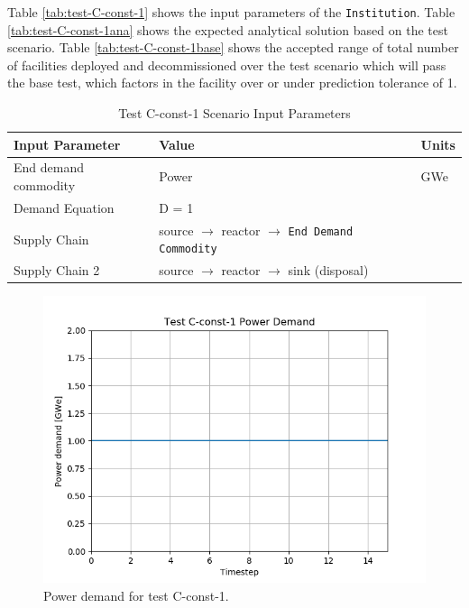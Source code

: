 \documentclass[11pt,letterpaper]{article}
\begin{document}
Table \ref{tab:test-C-const-1} shows the input parameters of the \texttt{Institution}. Table \ref{tab:test-C-const-1ana} shows the expected analytical solution based on the test scenario. Table \ref{tab:test-C-const-1base} shows the accepted range of total number of facilities deployed and decommissioned over the test scenario which will pass the base test, which factors in the facility over or under prediction tolerance of 1.

\begin{table}[H]
	\centering
	\caption{Test C-const-1 Scenario Input Parameters }
	\label{tab:test_C-const-1}
	\begin{tabular}{|l|l|l|}
		\hline
		\textbf{Input Parameter} & \textbf{Value} & \textbf{Units} \\
		\hline
		End demand commodity & Power & GWe \\
		Demand Equation & D = 1 & \\
		Supply Chain & source $\rightarrow$ reactor $\rightarrow$ \texttt{End Demand Commodity} &  \\
		Supply Chain 2 & source $\rightarrow$ reactor $\rightarrow$ sink (disposal) & \\
		\hline
	\end{tabular}
\end{table}

\begin{figure}[H]
	\begin{center}
		\includegraphics[scale=0.7]{./images/C-const-1.png}
	\end{center}
	\caption{Power demand for test C-const-1.}
	\label{fig:C-const-1}
\end{figure}
\end{document}
